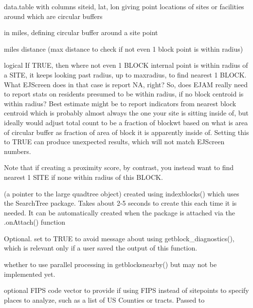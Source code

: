 \documentclass[a4paper]{book}
\begin{document}
\begin{Arguments}
\begin{ldescription}
\item[\code{sitepoints}] data.table with columns siteid, lat, lon giving point locations of sites or facilities around which are circular buffers

\item[\code{radius}] in miles, defining circular buffer around a site point

\item[\code{maxradius}] miles distance (max distance to check if not even 1 block point is within radius)

\item[\code{avoidorphans}] logical If TRUE, then where not even 1 BLOCK internal point is within radius of a SITE,
it keeps looking past radius, up to maxradius, to find nearest 1 BLOCK.
What EJScreen does in that case is report NA, right?
So, does EJAM really need to report stats on residents presumed to be within radius,
if no block centroid is within radius?
Best estimate might be to report indicators from nearest block centroid
which is probably almost always the one your site is sitting inside of,
but ideally would adjust total count to be a fraction of blockwt
based on what is area of circular buffer as fraction of area of block it is apparently inside of.
Setting this to TRUE can produce unexpected results, which will not match EJScreen numbers.

Note that if creating a proximity score, by contrast, you
instead want to find nearest 1 SITE if none within radius of this BLOCK.

\item[\code{quadtree}] (a pointer to the large quadtree object) created using indexblocks() which uses the SearchTree package.
Takes about 2-5 seconds to create this each time it is needed.
It can be automatically created when the package is attached via the .onAttach() function

\item[\code{quiet}] Optional. set to TRUE to avoid message about using getblock\_diagnostics(),
which is relevant only if a user saved the output of this function.

\item[\code{parallel}] whether to use parallel processing in getblocksnearby() but may not be implemented yet.

\item[\code{fips}] optional FIPS code vector to provide if using FIPS instead of sitepoints to specify places to analyze,
such as a list of US Counties or tracts. Passed to 


\end{ldescription}
\end{Arguments}
\end{document}
